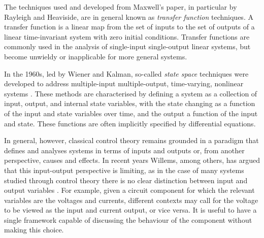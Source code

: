 The techniques used and developed from Maxwell's paper, in particular by Rayleigh and Heaviside, are in general known as \emph{transfer function} techniques. A transfer function is a linear map from the set of inputs to the set of outputs of a linear time-invariant system with zero initial conditions. Transfer functions are commonly used in the analysis of single-input single-output linear systems, but become unwieldy or inapplicable for more general systems.

In the 1960s, led by Wiener and Kalman, so-called \emph{state space} techniques were developed to address multiple-input multiple-output, time-varying, nonlinear systems \cite{Fr}. These methods are characterised by defining a system as a collection of input, output, and internal state variables, with the state changing as a function of the input and state variables over time, and the output a function of the input and state. These functions are often implicitly specified by differential equations.

In general, however, classical control theory remains grounded in a paradigm that defines and analyses systems in terms of inputs and outputs or, from another perspective, causes and effects. In recent years Willems, among others, has argued that this input-output perspective is limiting, as in the case of many systems studied through control theory there is no clear distinction between input and output variables \cite{Wi}. For example, given a circuit component for which the relevant variables are the voltages and currents, different contexts may call for the voltage to be viewed as the input and current output, or vice versa. It is useful to have a single framework capable of discussing the behaviour of the component without making this choice.

